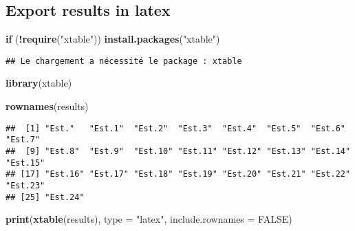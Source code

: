 \documentclass[
]{article}
\newenvironment{Shaded}{\begin{snugshade}}{\end{snugshade}}
\newcommand{\AttributeTok}[1]{\textcolor[rgb]{0.13,0.29,0.53}{#1}}
\newcommand{\ConstantTok}[1]{\textcolor[rgb]{0.56,0.35,0.01}{#1}}
\newcommand{\ControlFlowTok}[1]{\textcolor[rgb]{0.13,0.29,0.53}{\textbf{#1}}}
\newcommand{\FunctionTok}[1]{\textcolor[rgb]{0.13,0.29,0.53}{\textbf{#1}}}
\newcommand{\NormalTok}[1]{#1}
\newcommand{\SpecialCharTok}[1]{\textcolor[rgb]{0.81,0.36,0.00}{\textbf{#1}}}
\newcommand{\StringTok}[1]{\textcolor[rgb]{0.31,0.60,0.02}{#1}}
\begin{document}
\hypertarget{export-results-in-latex}{%
\subsection{Export results in latex}\label{export-results-in-latex}}

\begin{Shaded}
\begin{Highlighting}[]
\ControlFlowTok{if}\NormalTok{ (}\SpecialCharTok{!}\FunctionTok{require}\NormalTok{(}\StringTok{"xtable"}\NormalTok{)) }\FunctionTok{install.packages}\NormalTok{(}\StringTok{"xtable"}\NormalTok{)}
\end{Highlighting}
\end{Shaded}

\begin{verbatim}
## Le chargement a nécessité le package : xtable
\end{verbatim}

\begin{Shaded}
\begin{Highlighting}[]
\FunctionTok{library}\NormalTok{(xtable)}

\FunctionTok{rownames}\NormalTok{(results)}
\end{Highlighting}
\end{Shaded}

\begin{verbatim}
##  [1] "Est."   "Est.1"  "Est.2"  "Est.3"  "Est.4"  "Est.5"  "Est.6"  "Est.7" 
##  [9] "Est.8"  "Est.9"  "Est.10" "Est.11" "Est.12" "Est.13" "Est.14" "Est.15"
## [17] "Est.16" "Est.17" "Est.18" "Est.19" "Est.20" "Est.21" "Est.22" "Est.23"
## [25] "Est.24"
\end{verbatim}

\begin{Shaded}
\begin{Highlighting}[]
\FunctionTok{print}\NormalTok{(}\FunctionTok{xtable}\NormalTok{(results), }\AttributeTok{type =} \StringTok{"latex"}\NormalTok{, }\AttributeTok{include.rownames =} \ConstantTok{FALSE}\NormalTok{)}
\end{Highlighting}
\end{Shaded}
\end{document}
